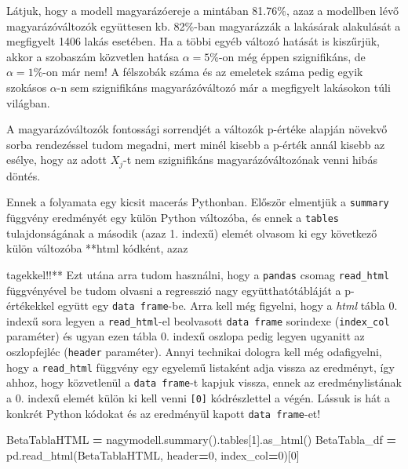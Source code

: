 \documentclass[
]{book}
\newenvironment{Shaded}{\begin{snugshade}}{\end{snugshade}}
\newcommand{\DecValTok}[1]{\textcolor[rgb]{0.00,0.00,0.81}{#1}}
\newcommand{\NormalTok}[1]{#1}
\newcommand{\OperatorTok}[1]{\textcolor[rgb]{0.81,0.36,0.00}{\textbf{#1}}}
\begin{document}
Látjuk, hogy a modell magyarázóereje a mintában 81.76\%, azaz a modellben lévő magyarázóváltozók együttesen kb. 82\%-ban magyarázzák a lakásárak alakulását a megfigyelt 1406 lakás esetében. Ha a többi egyéb változó hatását is kiszűrjük, akkor a szobaszám közvetlen hatása \(\alpha = 5\%\)-on még éppen szignifikáns, de \(\alpha = 1\%\)-on már nem! A félszobák száma és az emeletek száma pedig egyik szokásos \(\alpha\)-n sem szignifikáns magyarázóváltozó már a megfigyelt lakásokon túli világban.

A magyarázóváltozók fontossági sorrendjét a változók p-értéke alapján növekvő sorba rendezéssel tudom megadni, mert minél kisebb a p-érték annál kisebb az esélye, hogy az adott \(X_j\)-t nem szignifikáns magyarázóváltozónak venni hibás döntés.

Ennek a folyamata egy kicsit macerás Pythonban. Először elmentjük a \texttt{summary} függvény eredményét egy külön Python változóba, és ennek a \texttt{tables} tulajdonságának a második (azaz 1. indexű) elemét olvasom ki egy következő külön változóba **html kódként, azaz

tagekkel!!**
Ezt utána arra tudom használni, hogy a \texttt{pandas} csomag \texttt{read\_html} függvényével be tudom olvasni a regresszió nagy együtthatótábláját a p-értékekkel együtt egy \texttt{data\ frame}-be. Arra kell még figyelni, hogy a \emph{html} tábla 0. indexű sora legyen a \texttt{read\_html}-el beolvasott \texttt{data\ frame} sorindexe (\texttt{index\_col} paraméter) és ugyan ezen tábla 0. indexű oszlopa pedig legyen ugyanitt az oszlopfejléc (\texttt{header} paraméter).
Annyi technikai dologra kell még odafigyelni, hogy a \texttt{read\_html} függvény egy egyelemű listaként adja vissza az eredményt, így ahhoz, hogy közvetlenül a \texttt{data\ frame}-t kapjuk vissza, ennek az eredménylistának a 0. indexű elemét külön ki kell venni \texttt{{[}0{]}} kódrészlettel a végén.
Lássuk is hát a konkrét Python kódokat és az eredményül kapott \texttt{data\ frame}-et!

\begin{Shaded}
\begin{Highlighting}[]
\NormalTok{BetaTablaHTML }\OperatorTok{=}\NormalTok{ nagymodell.summary().tables[}\DecValTok{1}\NormalTok{].as\_html()}
\NormalTok{BetaTabla\_df }\OperatorTok{=}\NormalTok{ pd.read\_html(BetaTablaHTML, header}\OperatorTok{=}\DecValTok{0}\NormalTok{, index\_col}\OperatorTok{=}\DecValTok{0}\NormalTok{)[}\DecValTok{0}\NormalTok{]}
\end{Highlighting}
\end{Shaded}
\end{document}
